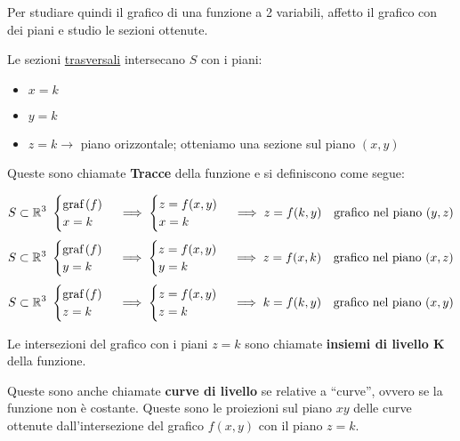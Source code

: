 Per studiare quindi il grafico di una funzione a 2 variabili, affetto il grafico con dei piani e studio le sezioni ottenute.

Le sezioni \underline{trasversali} intersecano \(S\) con i piani:
\begin{itemize}
    \item \(x=k\)
    \item \(y=k\)
    \item \(z=k \rightarrow \) piano orizzontale; otteniamo una sezione sul piano \((x,y)\)
\end{itemize}

Queste sono chiamate \textbf{Tracce} della funzione e si definiscono come segue:

\[
    S \subset \mathbb{R}^3\
    \begin{cases}
        \text{graf}\left(f\right) \\
        x=k
    \end{cases}
    \implies
    \begin{cases}
        z = f(x,y) \\
        x=k
    \end{cases}
    \implies
    z = f(k,y) \quad \text{grafico nel piano }(y,z)
\]
\[
    S \subset \mathbb{R}^3\
    \begin{cases}
        \text{graf}\left(f\right) \\
        y=k
    \end{cases}
    \implies
    \begin{cases}
        z = f(x,y) \\
        y=k
    \end{cases}
    \implies
    z = f(x,k) \quad \text{grafico nel piano }(x,z)
\]
\[
    S \subset \mathbb{R}^3\
    \begin{cases}
        \text{graf}\left(f\right) \\
        z=k
    \end{cases}
    \implies
    \begin{cases}
        z = f(x,y) \\
        z=k
    \end{cases}
    \implies
    k = f(k,y) \quad \text{grafico nel piano }(x,y)
\]

Le intersezioni del grafico con i piani \(z=k\) sono chiamate \textbf{insiemi di livello K} della funzione.

Queste sono anche chiamate \textbf{curve di livello} se relative a ``curve'', ovvero se la funzione non è costante. Queste sono le proiezioni sul piano \(xy\) delle curve ottenute dall'intersezione del grafico \(f(x,y)\) con il piano \(z=k\).

